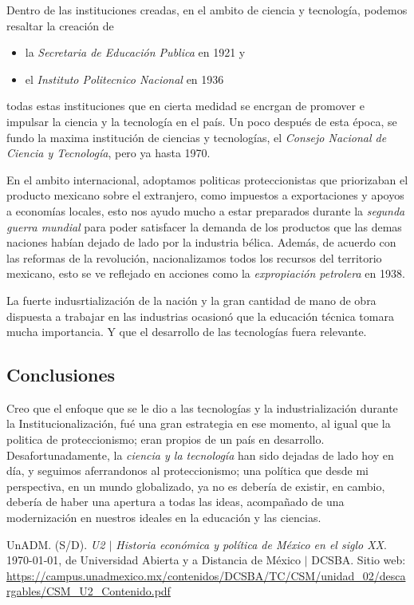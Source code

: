 \documentclass[12pt]{article}
\newcommand{\periodo}[0]{Institucionalizaci\'on}
\begin{document}
	\par Dentro de las instituciones creadas, en el ambito de ciencia y tecnolog\'ia, podemos resaltar la creaci\'on de 
	
	\begin{itemize}
		\item la \textit{Secretaria de Educaci\'on Publica} en  1921 y
		\item el \textit{Instituto Politecnico Nacional} en 1936
	\end{itemize}
	
	todas estas instituciones que en cierta medidad se encrgan de promover e impulsar la ciencia y la tecnolog\'ia en el pa\'is. Un poco despu\'es de esta \'epoca, se fundo la maxima instituci\'on de ciencias y tecnolog\'ias, el \textit{Consejo Nacional de Ciencia y Tecnolog\'ia}, pero ya hasta 1970.
	
	\par En el ambito internacional, adoptamos politicas proteccionistas que priorizaban el producto mexicano sobre el extranjero, como impuestos a exportaciones y apoyos a econom\'ias locales, esto nos ayudo mucho a estar preparados durante la \textit{segunda guerra mundial} para poder satisfacer la demanda de los productos que las demas naciones hab\'ian dejado de lado por la industria b\'elica. Adem\'as, de acuerdo con las reformas de la revoluci\'on, nacionalizamos todos los recursos del territorio mexicano, esto se ve reflejado en acciones como la \textit{expropiaci\'on petrolera} en 1938.

	\par La fuerte indusrtializaci\'on de la naci\'on y la gran cantidad de mano de obra dispuesta a trabajar en las industrias ocasion\'o que la educaci\'on t\'ecnica tomara mucha importancia. Y que el desarrollo de las tecnolog\'ias fuera relevante.
	
	
\subsection*{Conclusiones}
	\par Creo que el enfoque que se le dio a las tecnolog\'ias y la industrializaci\'on durante la \periodo, fu\'e una gran estrategia en ese momento, al igual que la politica de proteccionismo; eran propios de un pa\'is en desarrollo. Desafortunadamente, la \textit{ciencia y la tecnolog\'ia} han sido dejadas de lado hoy en d\'ia, y seguimos aferrandonos al proteccionismo; una pol\'itica que desde mi perspectiva, en un mundo globalizado, ya no es deber\'ia de existir, en cambio, deber\'ia de haber una apertura a todas las ideas, acompa\~nado de una modernizaci\'on en nuestros ideales en la educaci\'on y las ciencias.
\newpage
\begin{thebibliography}{X}
	 UnADM. (S/D). \textit{U2 $|$ Historia econ\'omica y pol\'itica de M\'exico en el siglo XX}. \today, de Universidad Abierta y a Distancia de M\'exico $|$ DCSBA. Sitio web: \url{https://campus.unadmexico.mx/contenidos/DCSBA/TC/CSM/unidad_02/descargables/CSM_U2_Contenido.pdf}
\end{thebibliography}
\end{document}
